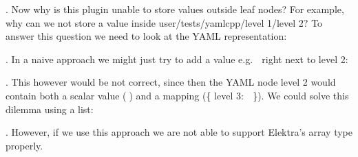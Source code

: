 . Now why is this plugin unable to store values outside leaf nodes? For example, why can we not store a value inside {\ttfamily user/tests/yamlcpp/level 1/level 2}? To answer this question we need to look at the Y\+A\+ML representation\+:


\begin{DoxyCode}{0}
\end{DoxyCode}


. In a naive approach we might just try to add a value e.\+g. {\ttfamily 🙈} right next to level 2\+:


\begin{DoxyCode}{0}
\end{DoxyCode}


. This however would be not correct, since then the Y\+A\+ML node {\ttfamily level 2} would contain both a scalar value ({\ttfamily 🙈}) and a mapping ({\ttfamily \{ level 3\+: 🍁 \}}). We could solve this dilemma using a list\+:


\begin{DoxyCode}{0}
\end{DoxyCode}


. However, if we use this approach we are not able to support Elektra’s array type properly.